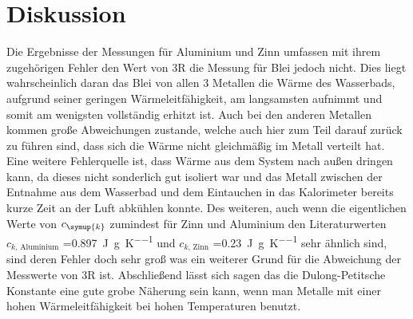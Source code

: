 \section{Diskussion}
\label{sec:Diskussion}
Die Ergebnisse der Messungen für Aluminium und Zinn umfassen mit
ihrem zugehörigen Fehler den Wert von 3R die Messung für Blei jedoch nicht.
Dies liegt wahrscheinlich daran das Blei von allen 3 Metallen die
Wärme des Wasserbads, aufgrund seiner geringen Wärmeleitfähigkeit,
am langsamsten aufnimmt und somit am wenigsten
vollständig erhitzt ist. Auch bei den anderen Metallen kommen große
Abweichungen zustande, welche auch hier zum Teil darauf zurück zu führen
sind, dass sich die Wärme nicht gleichmäßig im Metall verteilt hat.
Eine weitere Fehlerquelle ist, dass Wärme aus dem System nach außen dringen
kann, da dieses nicht sonderlich gut isoliert war und das Metall zwischen
der Entnahme aus dem Wasserbad und dem Eintauchen in das Kalorimeter
bereits kurze Zeit an der Luft abkühlen konnte. Des weiteren,
auch wenn die eigentlichen Werte von $c_\symup{k}$ zumindest für
Zinn und Aluminium den Literaturwerten\cite{chemie} $c_{k\text{, Aluminium}}$ =\SI{0,897}
{\joule\per\gram\per\kelvin} und $c_{k\text{, Zinn}}$ =\SI{0,23}
{\joule\per\gram\per\kelvin} sehr ähnlich sind, sind deren Fehler doch
sehr groß was ein weiterer Grund für die Abweichung der Messwerte
von 3R ist. Abschließend lässt sich sagen das die Dulong-Petitsche
Konstante eine gute grobe Näherung sein kann, wenn man Metalle mit einer
hohen Wärmeleitfähigkeit bei hohen Temperaturen benutzt.
